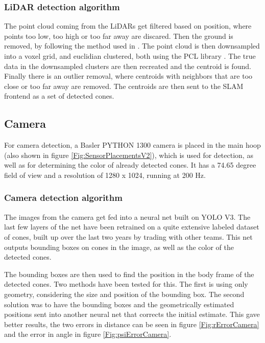 \subsubsection{LiDAR detection algorithm}
The point cloud coming from the LiDARs get filtered based on position, where points too low, too high or too far away are discared. Then the ground is removed, by following the method used in \cite{GroundRemoval}. The point cloud is then downsampled into a voxel grid, and euclidian clustered, both using the PCL library \cite{PCL}. The true data in the downsampled clusters are then recreated and the centroid is found. Finally there is an outlier removal, where centroids with neighbors that are too close or too far away are removed. The centroids are then sent to the SLAM frontend as a set of detected cones.

\subsection{Camera}
For camera detection, a Basler PYTHON 1300 camera is placed in the main hoop (also shown in figure \ref{Fig:SensorPlacementsV2}), which is used for detection, as well as for determining the color of already detected cones. It has a 74.65 degree field of view and a resolution of 1280 x 1024, running at 200 Hz. 

\subsubsection{Camera detection algorithm}
The images from the camera get fed into a neural net built on YOLO V3\cite{YOLOV3}. The last few layers of the net have been retrained on a quite extensive labeled dataset of cones, built up over the last two years by trading with other teams. This net outputs bounding boxes on cones in the image, as well as the color of the detected cones. 

The bounding boxes are then used to find the position in the body frame of the detected cones. Two methods have been tested for this. The first is using only geometry, considering the size and position of the bounding box. The second solution was to have the bounding boxes and the geometrically estimated positions sent into another neural net that corrects the initial estimate. This gave better results, the two errors in distance can be seen in figure \ref{Fig:rErrorCamera} and the error in angle in figure \ref{Fig:psiErrorCamera}.

